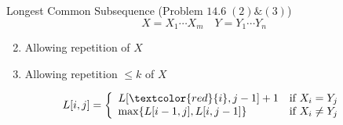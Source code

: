 \begin{frame}{}
  \begin{exampleblock}{Longest Common Subsequence (Problem $14.6\; (2) \& (3)$)}
    \[
      X = X_{1} \cdots X_{m} \quad Y = Y_{1} \cdots Y_{n}
    \]

    \begin{enumerate}[(1)]
      \setcounter{enumi}{1}
      \item Allowing repetition of $X$
      \item<3-> Allowing repetition $\le k$ of $X$
    \end{enumerate}
  \end{exampleblock}

  \pause
  \begin{displaymath}
    L[i,j] = \left\{ \begin{array}{ll}
      L[\textcolor{red}{i}, j-1] + 1 & \textrm{if $X_{i} = Y_{j}$}\\
      \max \set{L[i-1,j], L[i,j-1]} & \textrm{if $X_{i} \neq Y_{j}$}
    \end{array} \right.
  \end{displaymath}

  \vspace{0.50cm}
\end{frame}

